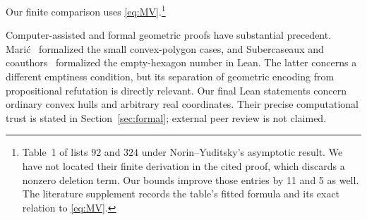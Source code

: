 \documentclass[11pt]{amsart}
\numberwithin{equation}{section}
\theoremstyle{definition}
\theoremstyle{remark}
\begin{document}
Our finite comparison uses \eqref{eq:MV}.\footnote{Table~1 of
\cite{KK} lists $92$ and $324$ under Norin--Yuditsky's asymptotic
result. We have not located their finite derivation in the cited proof,
which discards a nonzero deletion term. Our bounds improve those
entries by 11 and 5 as well. The literature supplement records the
table's fitted formula and its exact relation to \eqref{eq:MV}.}

Computer-assisted and formal geometric proofs have substantial precedent.
Mari\'c~\cite{Maric} formalized the small convex-polygon cases, and
Subercaseaux and coauthors~\cite{EmptyLean} formalized the empty-hexagon
number in Lean. The latter concerns a different emptiness condition,
but its separation of geometric encoding from propositional refutation
is directly relevant. Our final Lean statements concern ordinary
convex hulls and arbitrary real coordinates. Their precise computational
trust is stated in Section~\ref{sec:formal}; external peer review is
not claimed.





\appendix


\clearpage

\end{document}
